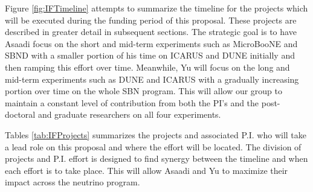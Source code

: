 Figure \ref{fig:IFTimeline} attempts to summarize the timeline for the projects which will be executed during the funding period of this proposal. These projects are described in greater detail in subsequent sections. The strategic goal is to have Asaadi focus on the short and mid-term experiments such as MicroBooNE and SBND with a smaller portion of his time on ICARUS and DUNE initially and then ramping this effort over time. Meanwhile, Yu will focus on the long and mid-term experiments such as DUNE and ICARUS with a gradually increasing portion over time on the whole SBN program. This will allow our group to maintain a constant level of contribution from both the PI's and the post-doctoral and graduate researchers on all four experiments.

Tables \ref{tab:IFProjects} summarizes the projects and associated P.I. who will take a lead role on this proposal and where the effort will be located. The division of projects and P.I. effort is designed to find synergy between the timeline and when each effort is to take place. This will allow Asaadi and Yu to maximize their impact across the neutrino program. 

